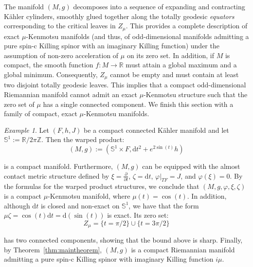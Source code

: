 \documentclass[10pt,a4paper,twoside,reqno]{amsart}
\theoremstyle{plain}
\theoremstyle{definition}
\theoremstyle{remark}
\newtheorem{example}[thm]{Example}
\def\Z{\mathbb{Z}}
\def\R{\mathbb{R}}
\def\dd{\mathrm{d}}
\def\R{\mathbb{R}}
\def\dd{\mathrm{d}}
\begin{document}
\noindent
The manifold $(M,g)$ decomposes into a sequence of expanding and contracting Kähler cylinders, smoothly glued together along the totally geodesic \emph{equators} corresponding to the critical leaves in $Z_\mu$. This provides a complete description of exact $\mu$-Kenmotsu manifolds (and thus, of odd-dimensional manifolds admitting a pure spin-c Killing spinor with an imaginary Killing function) under the assumption of non-zero acceleration of $\mu$ on its zero set. In addition, if $M$ is compact, the smooth function $f\colon M \to \mathbb{R}$ must attain a global maximum and a global minimum. Consequently, $Z_\mu$ cannot be empty and must contain at least two disjoint totally geodesic leaves. This implies that a compact odd-dimensional Riemannian manifold cannot admit an exact $\mu$-Kenmotsu structure such that the zero set of $\mu$ has a single connected component. We finish this section with a family of compact, exact $\mu$-Kenmotsu manifolds.

\begin{example}
Let $(F,h,J)$ be a compact connected Kähler manifold and let $\mathbb{S}^1:=\R/2\pi\Z$. Then the warped product:
\begin{equation*}
(M,g):=(\mathbb{S}^1 \times F, \dd t^2 + e^{2\sin(t)} h)
\end{equation*}

\noindent
is a compact manifold. Furthermore, $(M,g)$ can be equipped with the almost contact metric structure defined by $\xi= \frac{\partial}{\partial t}$, $\zeta=\mathrm{d}t$, $\varphi|_{TF}=J$, and $\varphi(\xi)=0$. By the formulas for the warped product structures, we conclude that $(M,g,\varphi,\xi,\zeta)$ is a compact $\mu$-Kenmotsu manifold, where $\mu(t) = \cos(t)$. In addition, although $\dd t$ is closed and non-exact on $\mathbb{S}^1$, we have that the form $\mu\zeta = \cos (t) \dd t = \dd (\sin (t))$ is exact. Its zero set:
\begin{equation*}
Z_{\mu} = \{t= \pi/2 \} \cup \{ t= 3\pi/2 \}
\end{equation*}

\noindent
has two connected components, showing that the bound above is sharp. Finally, by Theorem~\ref{thm:maintheorem}, $(M,g)$ is a compact Riemannian manifold admitting a pure spin-c Killing spinor with imaginary Killing function $i\mu$.
\end{example}




\end{document}
